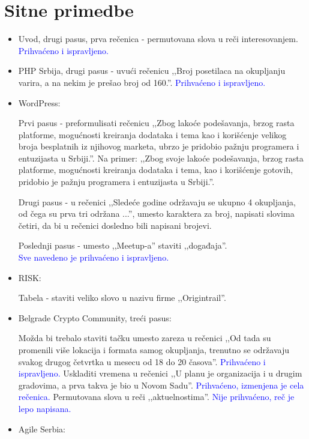 \documentclass[a4paper]{report}
\newcommand{\odgovor}[1]{\textcolor{blue}{#1}}
\begin{document}
\section{Sitne primedbe}
\begin{itemize}
    \item Uvod, drugi pasus, prva rečenica - permutovana slova u reči interesovanjem.
    \odgovor{Prihvaćeno i ispravljeno.}
    \item PHP Srbija, drugi pasus - uvući rečenicu ,,Broj posetilaca na okupljanju varira, a na nekim je prešao broj od 160.''. 
    \odgovor{Prihvaćeno i ispravljeno.}
    \item WordPress:
    
    Prvi pasus - preformulisati rečenicu ,,Zbog lakoće podešavanja, brzog rasta platforme, mogućnosti kreiranja dodataka i tema kao i korišćenje velikog broja besplatnih iz njihovog marketa, ubrzo je pridobio pažnju programera i entuzijasta u Srbiji.''. Na primer: ,,Zbog svoje lakoće podešavanja, brzog rasta platforme, mogućnosti kreiranja dodataka i tema, kao i korišćenje gotovih, pridobio je pažnju programera i  entuzijasta u Srbiji.''. 
    
    Drugi pasus - u rečenici ,,Sledeće godine održavaju se ukupno 4 okupljanja, od čega su prva tri održana ...'', umesto karaktera za broj, napisati slovima četiri, da bi u rečenici dosledno bili napisani brojevi.
    
     Poslednji pasus - umesto ,,Meetup-a'' staviti ,,događaja''. \\
     \odgovor{Sve navedeno je prihvaćeno i ispravljeno.}
    \item RISK:
    
    Tabela - staviti veliko slovo u nazivu firme ,,Origintrail''.
    
    \item Belgrade Crypto Community, treći pasus:
    
    Možda bi trebalo staviti tačku umesto zareza u rečenici ,,Od tada su promenili više lokacija i formata samog okupljanja, trenutno se održavaju svakog drugog četvrtka u mesecu od 18 do 20 časova''.
    \odgovor{Prihvaćeno i ispravljeno.}
    Uskladiti vremena u rečenici ,,U planu je organizacija i u drugim gradovima, a prva takva je bio u Novom Sadu''.
    \odgovor{Prihvaćeno, izmenjena je cela rečenica.}
    Permutovana slova u reči ,,aktuelnostima''.
    \odgovor{Nije prihvaćeno, reč je lepo napisana. }
    \item Agile Serbia:
    

\end{itemize}
\end{document}

